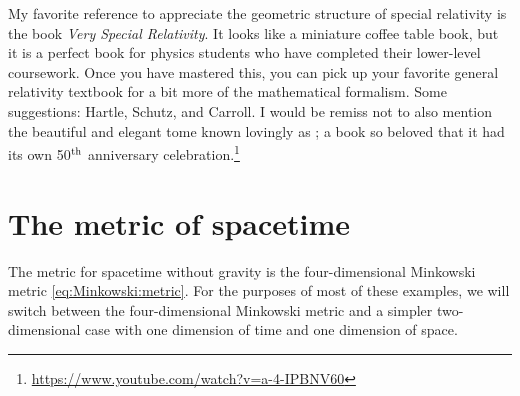 \documentclass[12pt, oneside]{report}    %
\let\oldsection\section
\def\section{%
  \setcounter{sidenote}{1}%
  \oldsection
}
\begin{document}
My favorite reference to appreciate the geometric structure of special relativity is the book \emph{Very Special Relativity}\autocite{bais2007very}. It looks like a miniature coffee table book, but it is a perfect book for physics students who have completed their lower-level coursework. Once you have mastered this, you can pick up your favorite general relativity textbook for a bit more of the mathematical formalism. Some suggestions: Hartle\autocite{Hartle:2003yu}, Schutz\autocite{schutz2009first}, and Carroll\autocite{Carroll:2004st}. I would be remiss not to also mention the beautiful and elegant tome known lovingly as \autocite{misner2017gravitation}; a book so beloved that it had its own 50$^\textnormal{th}$ anniversary celebration.\footnote{\url{https://www.youtube.com/watch?v=a-4-IPBNV60}}



\section{The metric of spacetime}

The metric for spacetime without gravity is the four-dimensional Minkowski metric \eqref{eq:Minkowski:metric}. For the purposes of most of these examples, we will switch between the four-dimensional Minkowski metric and a simpler two-dimensional case with one dimension of time and one dimension of space. 
\end{document}
